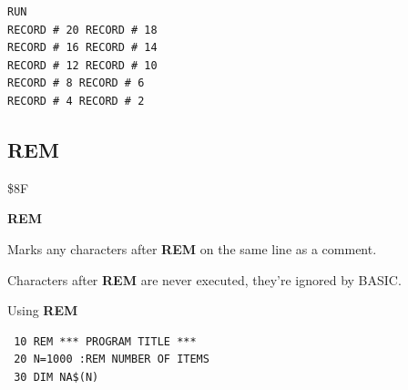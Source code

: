 \begin{description}[leftmargin=2cm,style=nextline]
\begin{tcolorbox}[colback=black,coltext=white]
\begin{verbatim}
RUN
RECORD # 20 RECORD # 18
RECORD # 16 RECORD # 14
RECORD # 12 RECORD # 10
RECORD # 8 RECORD # 6
RECORD # 4 RECORD # 2
\end{verbatim}
\end{tcolorbox}
\end{description}


\newpage
\subsection{REM}
\begin{description}[leftmargin=2cm,style=nextline]
\item [Token:] \$8F
\item [Format:] {\bf REM}
\item [Usage:]  Marks any characters after {\bf REM} on the same line as a comment.

                Characters after {\bf REM} are never executed, they're ignored by BASIC.

\item [Example:] Using {\bf REM}

\begin{tcolorbox}[colback=black,coltext=white]
\verbatimfont{\codefont}
\begin{verbatim}
 10 REM *** PROGRAM TITLE ***
 20 N=1000 :REM NUMBER OF ITEMS
 30 DIM NA$(N)
\end{verbatim}
\end{tcolorbox}
\end{description}


\newpage
